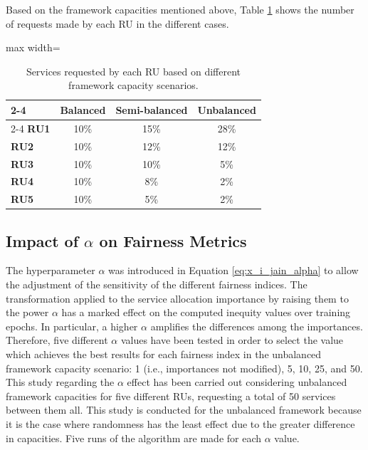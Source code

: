 \documentclass[preprint,12pt]{elsarticle}
\begin{document}
Based on the framework capacities mentioned above, Table \ref{tab:requests} shows the number of requests made by each RU in the different cases.

\begin{table}[htbp]
\centering
\begin{adjustbox}{max width=\textwidth}
\begin{tabular}{|l|c|c|c|}
\cline{2-4}
\multicolumn{1}{c|}{} & \textbf{Balanced} & \textbf{Semi-balanced} & \textbf{Unbalanced} \\
\cline{2-4} \hline
\textbf{RU1} & 10\% & 15\% & 28\% \\ \hline
\textbf{RU2} & 10\% & 12\% & 12\% \\ \hline
\textbf{RU3} & 10\% & 10\% & 5\% \\ \hline
\textbf{RU4} & 10\% & 8\% & 2\% \\ \hline
\textbf{RU5} & 10\% & 5\% & 2\% \\ \hline
\end{tabular}
\end{adjustbox}
\caption{Services requested by each RU based on different framework capacity scenarios.}
\label{tab:requests}
\end{table}

\subsection{Impact of $\alpha$ on Fairness Metrics}

The hyperparameter $\alpha$ was introduced in Equation \ref{eq:x_i_jain_alpha} to allow the adjustment of the sensitivity of the different fairness indices. The transformation applied to the service allocation importance by raising them to the power $\alpha$ has a marked effect on the computed inequity values over training epochs. In particular, a higher $\alpha$ amplifies the differences among the importances. Therefore, five different $\alpha$ values have been tested in order to select the value which achieves the best results for each fairness index in the unbalanced framework capacity scenario: 1 (i.e., importances not modified), 5, 10, 25, and 50. This study regarding the $\alpha$ effect has been carried out considering unbalanced framework capacities for five different RUs, requesting a total of 50 services between them all. This study is conducted for the unbalanced framework because it is the case where randomness has the least effect due to the greater difference in capacities. Five runs of the algorithm are made for each $\alpha$ value.
\end{document}
